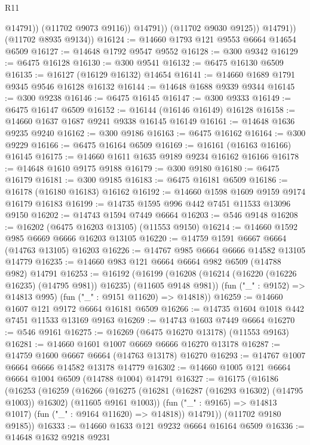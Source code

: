 \begin{lexlean}{R11}
\begin{coremodule}
{{{{{{{{{{{{{{{{{{{{{{{{{{{{{{{{{{{{{{{{{{{{{{{{{{{{{{{{{{{{{{{{{{{{{{{{{{{{{{{{{{                      @14791))
                  (@11702 @9073 @9116))
                @14791))
            (@11702 @9030 @9125))
          @14791))
      (@11702 @8935 @9134))
@16124 := @14660 @1793 @121 @9553 @6664 @14654 @6509
@16127 := @14648 @1792 @9547 @9552
@16128 := @300 @9342
@16129 := @6475 @16128
@16130 := @300 @9541
@16132 := @6475 @16130 @6509
@16135 := @16127 (@16129 @16132) @14654
@16141 := @14660 @1689 @1791 @9345 @9546 @16128 @16132
@16144 := @14648 @1688 @9339 @9344
@16145 := @300 @9238
@16146 := @6475 @16145
@16147 := @300 @9333
@16149 := @6475 @16147 @6509
@16152 := @16144 (@16146 @16149) @16128
@16158 := @14660 @1637 @1687 @9241 @9338 @16145 @16149
@16161 := @14648 @1636 @9235 @9240
@16162 := @300 @9186
@16163 := @6475 @16162
@16164 := @300 @9229
@16166 := @6475 @16164 @6509
@16169 := @16161 (@16163 @16166) @16145
@16175 := @14660 @1611 @1635 @9189 @9234 @16162 @16166
@16178 := @14648 @1610 @9175 @9188
@16179 := @300 @9180
@16180 := @6475 @16179
@16181 := @300 @9185
@16183 := @6475 @16181 @6509
@16186 := @16178 (@16180 @16183) @16162
@16192 := @14660 @1598 @1609 @9159 @9174 @16179 @16183
@16199 := @14735 @1595 @996 @442 @7451 @11533 @13096 @9150
@16202 := @14743 @1594 @7449 @6664
@16203 := @546 @9148
@16208 := @16202 (@6475 @16203 @13105) (@11553 @9150)
@16214 := @14660 @1592 @985 @6669 @6666 @16203 @13105
@16220 := @14759 @1591 @6667 @6664 (@14763 @13105) @16203
@16226 := @14767 @985 @6664 @6666 @14582 @13105 @14779
@16235 := @14660 @983 @121 @6664 @6664 @982 @6509 (@14788 @982) @14791
@16253 := @16192
    (@16199
      (@16208 (@16214 (@16220 (@16226 @16235) (@14795 @981)) @16235) (@11605 @9148 @981))
      (fun ("_" : @9152) => @14813 @995)
      (fun ("_" : @9151 @11620) => @14818))
@16259 := @14660 @1607 @121 @9172 @6664 @16181 @6509
@16266 := @14735 @1604 @1018 @442 @7451 @11533 @13169 @9163
@16269 := @14743 @1603 @7449 @6664
@16270 := @546 @9161
@16275 := @16269 (@6475 @16270 @13178) (@11553 @9163)
@16281 := @14660 @1601 @1007 @6669 @6666 @16270 @13178
@16287 := @14759 @1600 @6667 @6664 (@14763 @13178) @16270
@16293 := @14767 @1007 @6664 @6666 @14582 @13178 @14779
@16302 := @14660 @1005 @121 @6664 @6664 @1004 @6509 (@14788 @1004) @14791
@16327 := @16175
    (@16186
      (@16253
        (@16259
          (@16266
            (@16275 (@16281 (@16287 (@16293 @16302) (@14795 @1003)) @16302) (@11605 @9161 @1003))
            (fun ("_" : @9165) => @14813 @1017)
            (fun ("_" : @9164 @11620) => @14818))
          @14791))
      (@11702 @9180 @9185))
@16333 := @14660 @1633 @121 @9232 @6664 @16164 @6509
@16336 := @14648 @1632 @9218 @9231
}}}}}}}}}}}}}}}}}}}}}}}}}}}}}}}}}}}}}}}}}}}}}}}}}}}}}}}}}}}}}}}}}}}}}}}}}}}}}}}}}}
\end{coremodule}
\end{lexlean}
